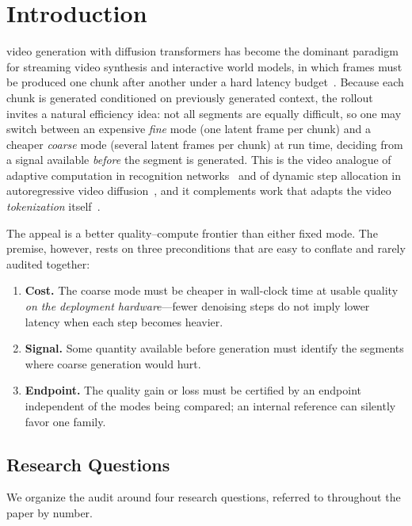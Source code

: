 \documentclass[journal]{IEEEtran}
\begin{document}
\section{Introduction}
 video generation with diffusion transformers has become the dominant paradigm for streaming video synthesis and interactive world models, in which frames must be produced one chunk after another under a hard latency budget~\cite{zhengCausalrCMUnifiedTeacherForcing2026,huangSelfForcingBridging2025,zhuCausalForcingAutoregressive2026a,zhaoCausalForcingScalable2026a,aiMAGI1AutoregressiveVideo2025,zhaoMinWMFullStackOpenSource2026a}. Because each chunk is generated conditioned on previously generated context, the rollout invites a natural efficiency idea: not all segments are equally difficult, so one may switch between an expensive \emph{fine} mode (one latent frame per chunk) and a cheaper \emph{coarse} mode (several latent frames per chunk) at run time, deciding from a signal available \emph{before} the segment is generated. This is the video analogue of adaptive computation in recognition networks~\cite{gravesAdaptiveComputationTime2017,teerapittayanonBranchyNetFastInference2017,wangSkipNetLearningDynamic2018} and of dynamic step allocation in autoregressive video diffusion~\cite{leDSADynamicStep2026}, and it complements work that adapts the video \emph{tokenization} itself~\cite{liLearningAdaptiveTemporally2025,xiongEVATokAdaptiveLength2026,yuanDLFRVAEDynamicLatent2025,zhongVFRTokVariableFrame2025}.

The appeal is a better quality--compute frontier than either fixed mode. The premise, however, rests on three preconditions that are easy to conflate and rarely audited together:
\begin{enumerate}
\item[(P1)] \textbf{Cost.} The coarse mode must be cheaper in wall-clock time at usable quality \emph{on the deployment hardware}---fewer denoising steps do not imply lower latency when each step becomes heavier.
\item[(P2)] \textbf{Signal.} Some quantity available before generation must identify the segments where coarse generation would hurt.
\item[(P3)] \textbf{Endpoint.} The quality gain or loss must be certified by an endpoint independent of the modes being compared; an internal reference can silently favor one family.
\end{enumerate}

\subsection{Research Questions}
We organize the audit around four research questions, referred to throughout the paper by number.
\end{document}
